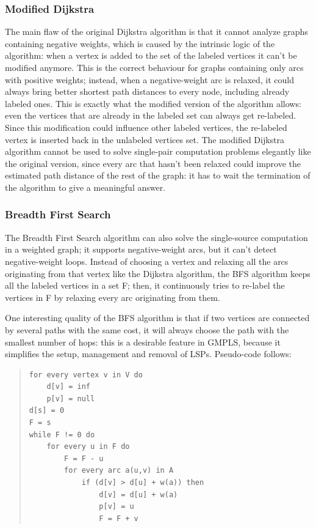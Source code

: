 \documentclass[10pt,a4paper]{report}
\begin{document}
\subsubsection{Modified Dijkstra}

The main flaw of the original Dijkstra algorithm is that it cannot
analyze graphs containing negative weights, which is caused by the
intrinsic logic of the algorithm: when a vertex is added to the set of
the labeled vertices it can't be modified anymore. This is the correct
behaviour for graphs containing only arcs with positive weights;
instead, when a negative-weight arc is relaxed, it could always bring
better shortest path distances to every node, including already
labeled ones. This is exactly what the modified version of the
algorithm allows: even the vertices that are already in the labeled
set can always get re-labeled. Since this modification could influence
other labeled vertices, the re-labeled vertex is inserted back in the
unlabeled vertices set. The modified Dijkstra algorithm cannot be used
to solve single-pair computation problems elegantly like the original
version, since every arc that hasn't been relaxed could improve the
estimated path distance of the rest of the graph: it has to wait the
termination of the algorithm to give a meaningful answer.

\subsubsection{Breadth First Search}

The Breadth First Search algorithm can also solve the single-source
computation in a weighted graph; it supports negative-weight arcs, but
it can't detect negative-weight loops. Instead of choosing a vertex
and relaxing all the arcs originating from that vertex like the
Dijkstra algorithm, the BFS algorithm keeps all the labeled vertices
in a set F; then, it continuously tries to re-label the vertices in F
by relaxing every arc originating from them.

One interesting quality of the BFS algorithm is that if two vertices
are connected by several paths with the same cost, it will always
choose the path with the smallest number of hops: this is a desirable
feature in GMPLS, because it simplifies the setup, management and
removal of LSPs\@. Pseudo-code follows:

\begin{quote}
\begin{lstlisting}
for every vertex v in V do
    d[v] = inf
    p[v] = null
d[s] = 0
F = s
while F != 0 do
    for every u in F do
        F = F - u
        for every arc a(u,v) in A
            if (d[v] > d[u] + w(a)) then
                d[v] = d[u] + w(a)
                p[v] = u
                F = F + v
\end{lstlisting}
\end{quote}
\end{document}
